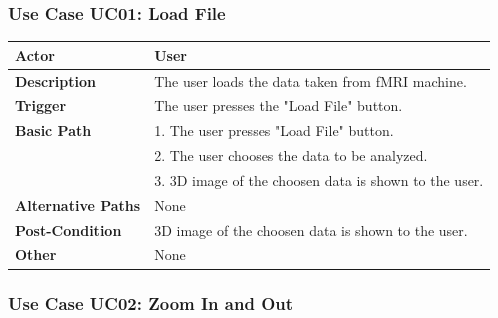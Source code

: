 \documentclass[paper=a4, fontsize=12pt]{scrartcl}	%
\numberwithin{equation}{section}		%
\numberwithin{figure}{section}			%
\numberwithin{table}{section}				%
\newcommand{\skipsubsection}[0]{\vspace{1cm}}
\begin{document}
    

    \begin{center}
    \end{center}
    \subsubsection{Use Case UC01: Load File}
      
    \begin{center}
    \end{center}
    
    
    	\begin{center}
        	\begin{tabular}{ | p{4cm} | p{9cm} |}
            	\hline
                	\textbf{Actor} & User\\ \hline
                    \textbf{Description} & The user loads the data taken from fMRI machine.\\ \hline
                    \textbf{Trigger} & The user presses the "Load File" button.\\ \hline
                    \textbf{Basic Path} & 1. The user presses "Load File" button.\\
                    & 2. The user chooses the data to be analyzed.\\
                    & 3. 3D image of the choosen data is shown to the user.\\
                    \hline
                    \textbf{Alternative Paths} & None\\ \hline
                    \textbf{Post-Condition} & 3D image of the choosen data is shown to the user.\\ \hline
                    \textbf{Other} & None\\
                \hline
            \end{tabular}
        \end{center}
    \skipsubsection
    
    \subsubsection{Use Case UC02: Zoom In and Out}
     \begin{center}
    \end{center}
    
\end{document}
